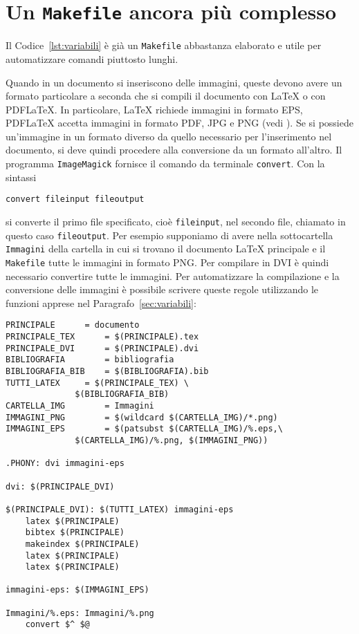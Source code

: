 \section{Un \texttt{Makefile} ancora più complesso}
Il Codice~\ref{lst:variabili} è già un \verb|Makefile| abbastanza elaborato e
utile per automatizzare comandi piuttosto lunghi.

Quando in un documento si inseriscono delle immagini, queste devono avere un
formato particolare a seconda che si compili il documento con \LaTeX{}
o con \textsc{PDF}\LaTeX.  In particolare, \LaTeX{}
richiede immagini in formato \textsc{EPS}, \textsc{PDF}\LaTeX{}
accetta immagini in formato \textsc{PDF}, \textsc{JPG} e \textsc{PNG} (vedi
\textcite[105]{pantieri:latex}).  Se si possiede un'immagine in un formato
diverso da quello necessario per l'inserimento nel documento, si deve quindi
procedere alla conversione da un formato all'altro.  Il programma
\verb|ImageMagick| fornisce il comando da terminale \verb|convert|. Con la
sintassi
\begin{verbatim}
convert fileinput fileoutput
\end{verbatim}
si converte il primo file specificato, cioè \verb|fileinput|, nel secondo file,
chiamato in questo caso \verb|fileoutput|.  Per esempio supponiamo di avere
nella sottocartella \verb|Immagini| della cartella in cui si trovano il
documento \LaTeX{}
principale e il \verb|Makefile| tutte le immagini in formato \textsc{PNG}.  Per
compilare in \textsc{DVI} è quindi necessario convertire tutte le immagini.  Per
automatizzare la compilazione e la conversione delle immagini è possibile
scrivere queste regole utilizzando le funzioni apprese nel
Paragrafo~\ref{sec:variabili}:
\begin{lstlisting}[caption={\texttt{Makefile} in cui le immagini \textsc{PNG}
vengono convertite in \textsc{EPS} nella compilazione con \LaTeX},label=lst:png-eps]
PRINCIPALE 		= documento
PRINCIPALE_TEX		= $(PRINCIPALE).tex
PRINCIPALE_DVI		= $(PRINCIPALE).dvi
BIBLIOGRAFIA		= bibliografia
BIBLIOGRAFIA_BIB	= $(BIBLIOGRAFIA).bib
TUTTI_LATEX		= $(PRINCIPALE_TEX) \
			  $(BIBLIOGRAFIA_BIB)
CARTELLA_IMG		= Immagini
IMMAGINI_PNG		= $(wildcard $(CARTELLA_IMG)/*.png)
IMMAGINI_EPS		= $(patsubst $(CARTELLA_IMG)/%.eps,\
			  $(CARTELLA_IMG)/%.png, $(IMMAGINI_PNG))

.PHONY: dvi immagini-eps

dvi: $(PRINCIPALE_DVI)

$(PRINCIPALE_DVI): $(TUTTI_LATEX) immagini-eps
	latex $(PRINCIPALE)
	bibtex $(PRINCIPALE)
	makeindex $(PRINCIPALE)
	latex $(PRINCIPALE)
	latex $(PRINCIPALE)

immagini-eps: $(IMMAGINI_EPS)

Immagini/%.eps: Immagini/%.png
	convert $^ $@
\end{lstlisting}
